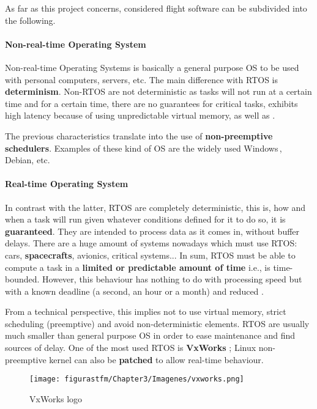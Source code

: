 As far as this project concerns, considered flight software can be subdivided into the following.

\paragraph{Non-real-time Operating System}

Non-real-time Operating Systems is basically a general purpose \acrshort{OS} to be used with personal computers, servers, etc. The main difference with \acrshort{RTOS} is \textbf{determinism}. Non-\acrshort{RTOS} are not deterministic as tasks will not run at a certain time and for a certain time, there are no guarantees for critical tasks, exhibits high latency because of using unpredictable virtual memory, as well as .

The previous characteristics translate into the use of \textbf{non-preemptive schedulers}. Examples of these kind of \acrshort{OS} are the widely used Windows\,\textsuperscript{\textregistered}, Debian, etc.

\paragraph{Real-time Operating System}

In contrast with the latter, \acrshort{RTOS} are completely deterministic, this is, how and when a task will run given whatever conditions defined for it to do so, it is \textbf{guaranteed}. They are intended to process data as it comes in, without buffer delays. There are a huge amount of systems nowadays which must use \acrshort{RTOS}: cars, \textbf{spacecrafts}, avionics, critical systems... In sum, \acrshort{RTOS} must be able to compute a task in a \textbf{limited or predictable amount of time} i.e., is time-bounded. However, this behaviour has nothing to do with processing speed but with a known deadline (a second, an hour or a month) and reduced .

From a technical perspective, this implies not to use virtual memory, strict scheduling (preemptive) and avoid non-deterministic elements. \acrshort{RTOS} are usually much smaller than general purpose \acrshort{OS} in order to ease maintenance and find sources of delay. One of the most used \acrshort{RTOS} is \textbf{VxWorks} \cite{vxworks}; Linux non-preemptive kernel can also be \textbf{patched} to allow real-time behaviour.


			\begin{figure} [H] 				
				\centering
				\texttt{[image: figurastfm/Chapter3/Imagenes/vxworks.png]}
				\vspace{0.3cm}
				\caption{VxWorks logo \cite{vxworks}} 
				\vspace{-2cm}
			\end{figure}

